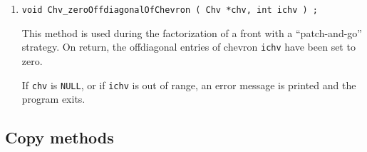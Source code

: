 \begin{enumerate}
\item
\begin{verbatim}
void Chv_zeroOffdiagonalOfChevron ( Chv *chv, int ichv ) ;
\end{verbatim}
This method is used during the factorization of a front
with a ``patch-and-go'' strategy.
On return, 
the offdiagonal entries of chevron {\tt ichv} have been set to zero.
\par {}
If {\tt chv} is {\tt NULL},
or if {\tt ichv} is out of range,
an error message is printed and the program exits.
\end{enumerate}
\par
\subsection{Copy methods}
\label{subsection:Chv:proto:copy}
\par
